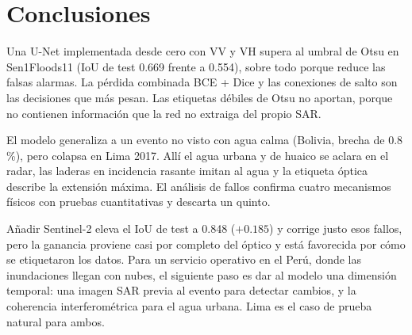 \section{Conclusiones}
\label{sec:conclusiones}

Una U-Net implementada desde cero con VV y VH supera al umbral de Otsu en Sen1Floods11 (IoU de
test 0.669 frente a 0.554), sobre todo porque reduce las falsas alarmas. La pérdida combinada BCE
+ Dice y las conexiones de salto son las decisiones que más pesan. Las etiquetas débiles de Otsu
no aportan, porque no contienen información que la red no extraiga del propio SAR.

El modelo generaliza a un evento no visto con agua calma (Bolivia, brecha de 0.8\,\%), pero
colapsa en Lima 2017. Allí el agua urbana y de huaico se aclara en el radar, las laderas en
incidencia rasante imitan al agua y la etiqueta óptica describe la extensión máxima. El análisis
de fallos confirma cuatro mecanismos físicos con pruebas cuantitativas y descarta un quinto.

Añadir Sentinel-2 eleva el IoU de test a 0.848 ($+0.185$) y corrige justo esos fallos, pero la
ganancia proviene casi por completo del óptico y está favorecida por cómo se etiquetaron los
datos. Para un servicio operativo en el Perú, donde las inundaciones llegan con nubes, el
siguiente paso es dar al modelo una dimensión temporal: una imagen SAR previa al evento para
detectar cambios, y la coherencia interferométrica para el agua urbana. Lima es el caso de
prueba natural para ambos.
